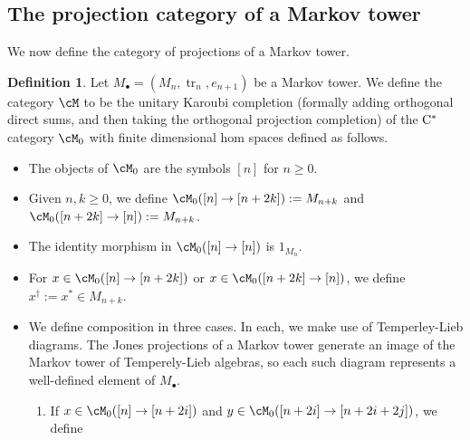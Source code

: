 \documentclass[11pt]{article}
\theoremstyle{plain}
\theoremstyle{definition}
\newtheorem{defn}[thm]{Definition}
\DeclareMathOperator{\tr}{tr}
\newcommand{\set}[2]{\left\{#1 \middle| #2\right\}}
\newcommand{\Cstar}{\rm{C^*}}
\newcommand{\nn}[1]{\textcolor{red}{[[#1]]}}
\begin{document}
\subsection{The projection category of a Markov tower}

We now define the category of projections of a Markov tower. 


\begin{defn}
\label{def:MarkovProjections}
Let $M_\bullet = (M_n, \tr_n, e_{n+1})$ be a Markov tower.
We define the category $\cM$ to be the unitary Karoubi completion (formally adding orthogonal direct sums, and then taking the orthogonal projection completion) of the $\Cstar$ category $\cM_0$ with finite dimensional hom spaces defined as follows.
\begin{itemize}
\item
The objects of $\cM_0$ are the symbols $[n]$ for $n\geq 0$.
\item
Given $n,k \geq 0$, we define 
$\cM_0([n] \to [n+2k]):= M_{n+k}$
and
$\cM_0([n+2k] \to [n]) := M_{n+k}$.
\item
The identity morphism in $\cM_0([n] \to [n])$ is $1_{M_n}$.
\item
For $x\in \cM_0([n]\to [n+2k])$ or $x\in \cM_0([n+2k] \to [n])$, we define $x^\dag := x^* \in M_{n+k}$.
%
\item
We define composition in three cases. In each, we make use of Temperley-Lieb diagrams. The Jones projections of a Markov tower generate an image of the Markov tower of Temperely-Lieb algebras, so each such diagram represents a well-defined element of $M_\bullet$. 
\begin{enumerate}[label={\rm(C\arabic*)}]
\item
\label{compose:upup}
If $x\in \cM_0([n] \to [n+2i])$ and $y\in \cM_0([n+2i] \to [n+2i+2j])$, we define 

\end{enumerate}
\end{itemize}
\end{defn}
\end{document}
